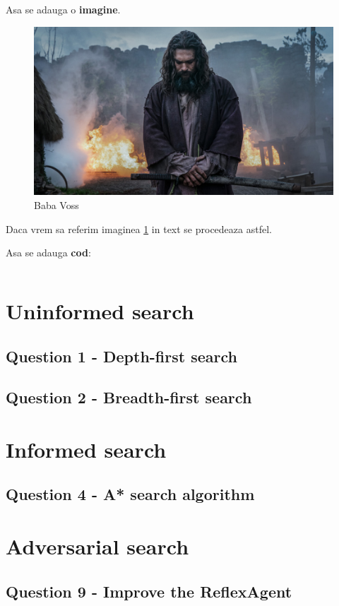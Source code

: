 \par Asa se adauga o \textbf{imagine}.
\begin{figure}[H]
    \centering  %
    \includegraphics[scale=0.35]{resources/see_image.jpg}  %
    \caption{Baba Voss}  %
    \label{fig:figura1} %
\end{figure}
Daca vrem sa referim imaginea \ref{fig:figura1} in text se procedeaza astfel.

\par Asa se adauga \textbf{cod}:
\inputminted[linenos]{python}{code/fibo.py}


\section{Uninformed search}
\subsection{Question 1 - Depth-first search}

\subsection{Question 2 - Breadth-first search}

\section{Informed search}
\subsection{Question 4 - A* search  algorithm}

\section{Adversarial search}
\subsection{Question 9 - Improve the ReflexAgent} 
